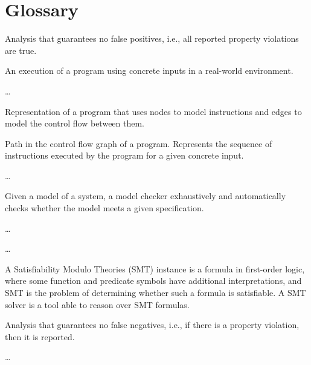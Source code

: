 
\section{Glossary}
\label{se:glossary}

 Analysis that guarantees no false positives, i.e., all reported property violations are true.

\smallskip{} An execution of a program using concrete inputs in a real-world environment.

\smallskip{} \ldots

\smallskip{} Representation of a program that uses nodes to model instructions and edges to model the control flow between them.

\smallskip{} Path in the control flow graph of a program. Represents the sequence of instructions executed by the program for a given concrete input.

\smallskip{} \ldots

\smallskip{} Given a model of a system, a model checker exhaustively and automatically checks whether the model meets a given specification.

\smallskip{} \ldots

\smallskip{} \ldots

\smallskip{} A Satisfiability Modulo Theories (SMT) instance is a formula in first-order logic, where some function and predicate symbols have additional interpretations, and SMT is the problem of determining whether such a formula is satisfiable. A SMT solver is a tool able to reason over SMT formulas.

\smallskip{} Analysis that guarantees no false negatives, i.e., if there is a property violation, then it is reported.

\smallskip{} \ldots